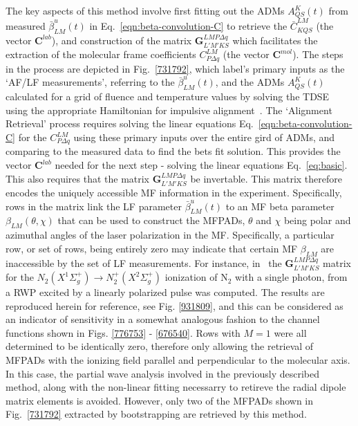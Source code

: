 \documentclass[10pt]{article}
\begin{document}
The key aspects of this method involve first fitting out the ADMs $A^K_{QS}(t)$ from measured $\bar{\beta}^u_{LM}(t)$ in Eq.~\ref{eqn:beta-convolution-C} to retrieve the $\bar{C}^{LM}_{KQS}$ (the vector $\mathbf{C}^{lab}$), and construction of the matrix $\mathbf{{G}}^{LMP\Delta q }_{L'M'KS}$ which facilitates the extraction of the molecular frame coefficients $C^{LM}_{P\Delta q}$ (the vector $\mathbf{C}^{mol}$). The steps in the process are depicted in Fig.~\ref{731792}, which label's primary inputs as the `AF/LF measurements', referring to the $\bar{\beta}^u_{LM}(t)$, and the ADMs $A^K_{QS}(t)$ calculated for a grid of fluence and temperature values by solving the TDSE using the appropriate Hamiltonian for impulsive alignment~\cite{hasegawa2015NonadiabaticMolecularAlignment, koch2019QuantumControlMolecular}. 
The `Alignment Retrieval' process requires solving the linear equations Eq.~\ref{eqn:beta-convolution-C} for the $C^{LM}_{P\Delta q}$ using these primary inputs over the entire gird of ADMs, and comparing to the measured data to find the bets fit solution. This provides the vector $\mathbf{C}^{lab}$ needed for the next step - solving the linear equations Eq.~\ref{eq:basic}. This also requires that the matrix $\mathbf{{G}}^{LMP\Delta q }_{L'M'KS}$ be invertable. This matrix therefore encodes the uniquely accessible MF information in the experiment. Specifically, rows in the matrix link the LF parameter $\bar{\beta}^u_{LM}(t)$  to an MF beta parameter $\beta_{LM}(\theta,\chi)$ that can be used to construct the MFPADs, $\theta$ and $\chi$ being polar and azimuthal angles of the laser polarization in the MF. Specifically, a particular row, or set of rows, being entirely zero may indicate that certain MF $\beta_{LM}$ are inaccessible by the set of LF measurements. For instance, in~\cite{gregory2021MolecularFramePhotoelectron} the $\mathbf{{G}}^{LMP\Delta q }_{L'M'KS}$ matrix for the $N_2(X^{1}\Sigma^{+}_{g}) \rightarrow N^+_2(X^{2}\Sigma^{+}_{g})$ ionization of N$_2$ with a single photon, from a RWP excited by a linearly polarized pulse was computed. The results are reproduced herein for reference, see Fig. \ref{931809}, and this can be considered as an indicator of sensitivity in a somewhat analogous fashion to the channel functions shown in Figs. \ref{776753} - \ref{676540}. Rows with $M = 1$ were all determined to be identically zero, therefore only allowing the retrieval of MFPADs with the ionizing field parallel and perpendicular to the molecular axis. In this case, the partial wave analysis involved in the previously described method, along with the non-linear fitting necessarry to retireve the radial dipole matrix elements is avoided. However, only two of the MFPADs shown in Fig.~\ref{731792} extracted by bootstrapping are retrieved by this method.\\
\end{document}
